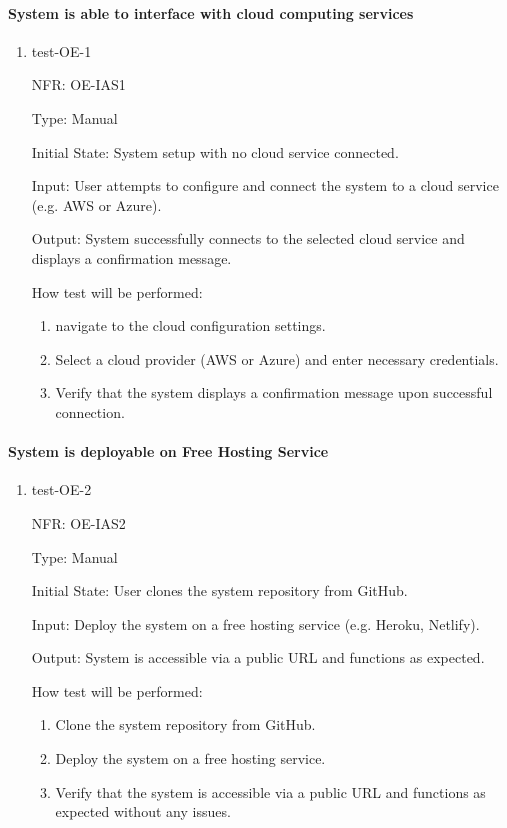\documentclass[12pt, titlepage]{article}
\begin{document}
\paragraph{System is able to interface with cloud computing services}
\begin{enumerate}
  \item{test-OE-1}

  NFR: OE-IAS1

  Type: Manual
            
  Initial State: System setup with no cloud service connected.
            
  Input:  User attempts to configure and connect the system to a cloud service (e.g. AWS or Azure).
            
  Output: System successfully connects to the selected cloud service and displays a confirmation message.
            
  How test will be performed: 
  \begin{enumerate}
    \item navigate to the cloud configuration settings.
    \item Select a cloud provider (AWS or Azure) and enter necessary credentials.
    \item Verify that the system displays a confirmation message upon successful connection.
  \end{enumerate}
\end{enumerate}

\paragraph{System is deployable on Free Hosting Service}
\begin{enumerate}
  \item{test-OE-2}

  NFR: OE-IAS2

  Type: Manual
            
  Initial State: User clones the system repository from GitHub.
            
  Input:  Deploy the system on a free hosting service (e.g. Heroku, Netlify).
            
  Output: System is accessible via a public URL and functions as expected.
            
  How test will be performed: 
  \begin{enumerate}
    \item Clone the system repository from GitHub.
    \item Deploy the system on a free hosting service.
    \item Verify that the system is accessible via a public URL and functions as expected without any issues.
  \end{enumerate}
\end{enumerate}
\end{document}
